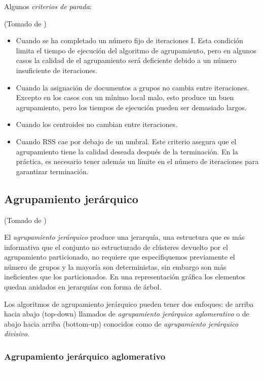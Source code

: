 \documentclass{llncs}
\begin{document}
Algunos \textit{criterios de parada}:
\begin{flushright}
	\scriptsize*(Tomado de \cite{B1})
	\normalsize
\end{flushright}
\begin{itemize}
	\item Cuando se ha completado un número fijo de iteraciones I. Esta condición limita el tiempo de ejecución del algoritmo de agrupamiento, pero en algunos casos la calidad de el agrupamiento será deficiente debido a un número insuficiente de iteraciones.
	\item Cuando la asignación de documentos a grupos no cambia entre iteraciones. Excepto en los casos con un m\'inimo local malo, esto produce un buen agrupamiento, pero los tiempos de ejecución pueden ser demasiado largos.
	\item Cuando los centroides no cambian entre iteraciones.
	\item Cuando RSS cae por debajo de un umbral. Este criterio asegura que el agrupamiento tiene la calidad deseada después de la terminación. En la práctica, es necesario tener adem\'as un límite en el número de iteraciones para garantizar terminación.
\end{itemize}

\subsection{Agrupamiento jer\'arquico}

\begin{flushright}
	\scriptsize*(Tomado de \cite{B1})
	\normalsize
\end{flushright}

El \textit{agrupamiento jerárquico} produce una jerarquía, una estructura que es más informativa que el conjunto no estructurado de clústeres devuelto por el agrupamiento particionado, no requiere que especifiquemos previamente el número de grupos y la mayoría son deterministas, sin embargo son m\'as ineficientes que los particionados. En una representación gráfica los elementos quedan anidados en jerarquías con forma de árbol.

Los algoritmos de agrupamiento jerárquico pueden tener dos enfoques: de arriba hacia abajo (top-down) llamados de \textit{agrupamiento jer\'arquico aglomerativo} o de abajo hacia arriba (bottom-up) conocidos como de \textit{agrupamiento jer\'arquico divisivo}. 

\subsubsection{Agrupamiento jer\'arquico aglomerativo}
\textcolor{white}{.}
\end{document}
